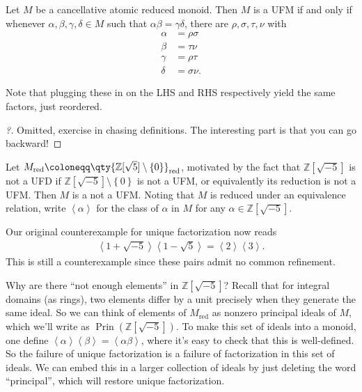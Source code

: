 \begin{theorem}[?]

Let \(M\) be a cancellative atomic reduced monoid. Then \(M\) is a UFM
if and only if whenever \(\alpha, \beta, \gamma, \delta \in M\) such
that \(\alpha \beta = \gamma \delta\), there are
\(\rho, \sigma, \tau, \nu\) with
\begin{align*}
\alpha &= \rho \sigma \\
\beta &= \tau \nu \\
\gamma &= \rho \tau \\
\delta &= \sigma \nu
.\end{align*}

Note that plugging these in on the LHS and RHS respectively yield the
same factors, just reordered.

\end{theorem}

\begin{proof}[?]

Omitted, exercise in chasing definitions. The interesting part is that
you can go backward!

\end{proof}

Let
\(M_{\operatorname{red}} \coloneqq\qty{{\mathbb{Z}}[ \sqrt{5} ] \setminus\left\{{0}\right\}}_{\operatorname{red}}\),
motivated by the fact that \({\mathbb{Z}}[ \sqrt{-5} ]\) is not a UFD if
\({\mathbb{Z}}[ \sqrt{-5} ] \setminus\left\{{0}\right\}\) is not a UFM,
or equivalently its reduction is not a UFM. Then \(M\) is a not a UFM.
Noting that \(M\) is reduced under an equivalence relation, write
\(\left\langle{ \alpha}\right\rangle\) for the class of \(\alpha\) in
\(M\) for any \(\alpha\in {\mathbb{Z}}[ \sqrt{-5} ]\).

Our original counterexample for unique factorization now reads
\begin{align*}
\left\langle{ 1 + \sqrt{-5} }\right\rangle \left\langle{ 1 - \sqrt{5} }\right\rangle = \left\langle{2}\right\rangle \left\langle{3}\right\rangle
.\end{align*}
This is still a counterexample since these pairs admit no common
refinement.

Why are there ``not enough elements'' in \({\mathbb{Z}}[ \sqrt{-5} ]\)?
Recall that for integral domains (as rings), two elements differ by a
unit precisely when they generate the same ideal. So we can think of
elements of \(M_{\operatorname{red}}\) as nonzero principal ideals of
\(M\), which we'll write as
\(\operatorname{Prin}( {\mathbb{Z}}[ \sqrt{-5} ])\). To make this set of
ideals into a monoid, one define
\(\left\langle{ \alpha }\right\rangle \left\langle{ \beta }\right\rangle= \left\langle{ \alpha \beta }\right\rangle\),
where it's easy to check that this is well-defined. So the failure of
unique factorization is a failure of factorization in this set of
ideals. We can embed this in a larger collection of ideals by just
deleting the word ``principal'', which will restore unique
factorization.

